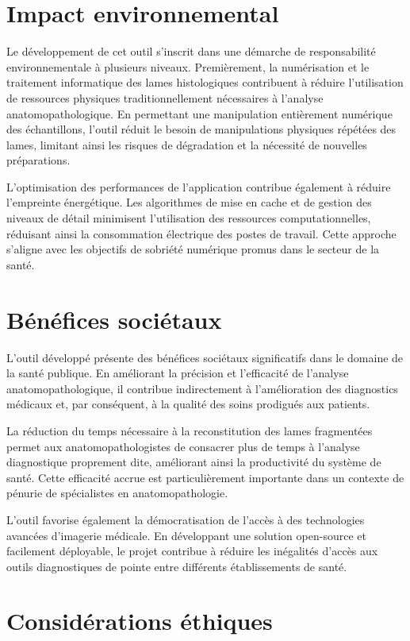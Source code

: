 \documentclass[12pt,a4paper]{report}
\begin{document}
\section{Impact environnemental}

Le développement de cet outil s'inscrit dans une démarche de responsabilité environnementale à plusieurs niveaux. Premièrement, la numérisation et le traitement informatique des lames histologiques contribuent à réduire l'utilisation de ressources physiques traditionnellement nécessaires à l'analyse anatomopathologique. En permettant une manipulation entièrement numérique des échantillons, l'outil réduit le besoin de manipulations physiques répétées des lames, limitant ainsi les risques de dégradation et la nécessité de nouvelles préparations.

L'optimisation des performances de l'application contribue également à réduire l'empreinte énergétique. Les algorithmes de mise en cache et de gestion des niveaux de détail minimisent l'utilisation des ressources computationnelles, réduisant ainsi la consommation électrique des postes de travail. Cette approche s'aligne avec les objectifs de sobriété numérique promus dans le secteur de la santé.

\section{Bénéfices sociétaux}

L'outil développé présente des bénéfices sociétaux significatifs dans le domaine de la santé publique. En améliorant la précision et l'efficacité de l'analyse anatomopathologique, il contribue indirectement à l'amélioration des diagnostics médicaux et, par conséquent, à la qualité des soins prodigués aux patients.

La réduction du temps nécessaire à la reconstitution des lames fragmentées permet aux anatomopathologistes de consacrer plus de temps à l'analyse diagnostique proprement dite, améliorant ainsi la productivité du système de santé. Cette efficacité accrue est particulièrement importante dans un contexte de pénurie de spécialistes en anatomopathologie.

L'outil favorise également la démocratisation de l'accès à des technologies avancées d'imagerie médicale. En développant une solution open-source et facilement déployable, le projet contribue à réduire les inégalités d'accès aux outils diagnostiques de pointe entre différents établissements de santé.

\section{Considérations éthiques}
\end{document}
